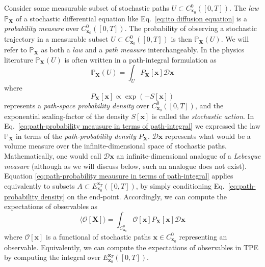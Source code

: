 Consider some measurable subset of stochastic paths $U \subset C_{\mathbf{x}_0}^0([0,T])$. The \textit{law} $\mathbb{P}_\mathbf{X}$ of a stochastic differential equation like Eq.~\ref{eq:ito diffusion equation} is a \textit{probability measure} over $C_{\mathbf{x}_0}^0([0,T])$. The probability of observing a stochastic trajectory in a measurable subset $U \subset C_{\mathbf{x}_0}^0([0,T])$ is then $\mathbb{P}_\mathbf{X}(U)$. We will refer to $\mathbb{P}_\mathbf{X}$ as both a \textit{law} and a \textit{path measure} interchangeably. In the physics literature $\mathbb{P}_\mathbf{X}(U)$ is often written in a path-integral formulation as \citep{huntPathIntegralSolutions1981, adibStochasticActionsDiffusive2008a, chaichianPathIntegralsPhysics2001}
\begin{equation} \label{eq:path-probability meausure in terms of path-integral}
\mathbb{P}_\mathbf{X}(U) = \int_U P_\mathbf{X}[\mathbf{x}] \mathcal{D} \mathbf{x}
\end{equation}
where
\begin{equation} \label{eq:path-probability density}
P_\mathbf{X}[\mathbf{x}] \propto \exp(-S[\mathbf{x}])
\end{equation}
represents a \textit{path-space probability density} over $C_{\mathbf{x}_0}^0([0,T])$, and the exponential scaling-factor of the density $S[\mathbf{x}]$ is called the \textit{stochastic action}. In Eq.~\ref{eq:path-probability meausure in terms of path-integral} we expressed the law $\mathbb{P}_\mathbf{X}$ in terms of the \textit{path-probability density} $P_\mathbf{X}$. $\mathcal{D} \mathbf{x}$ represents what would be a volume measure over the infinite-dimensional space of stochastic paths. Mathematically, one would call $\mathcal{D} \mathbf{x}$ an infinite-dimensional analogue of a \textit{Lebesgue measure} (although as we will discuss below, such an analogue does not exist). Equation \ref{eq:path-probability meausure in terms of path-integral} applies equivalently to subsets $A \subset E_{\mathbf{x}_0}^{\mathbf{x}_T}([0,T])$, by simply conditioning Eq.~\ref{eq:path-probability density} on the end-point. Accordingly, we can compute the expectations of observables as
\begin{equation} \label{eq:expectation of observable}
	\langle \mathcal{O}[\mathbf{X}] \rangle = \int_{C_{\mathbf{x}_0}^0} \mathcal{O}[\mathbf{x}] P_\mathbf{X}[\mathbf{x}] \mathcal{D} \mathbf{x}
\end{equation}
where $\mathcal{O}[\mathbf{x}]$ is a functional of stochastic paths $\mathbf{x} \in C_{\mathbf{x}_0}^0$ representing an observable. Equivalently, we can compute the expectations of observables in TPE by computing the integral over $E_{\mathbf{x}_0}^{\mathbf{x}_T}([0,T])$.

